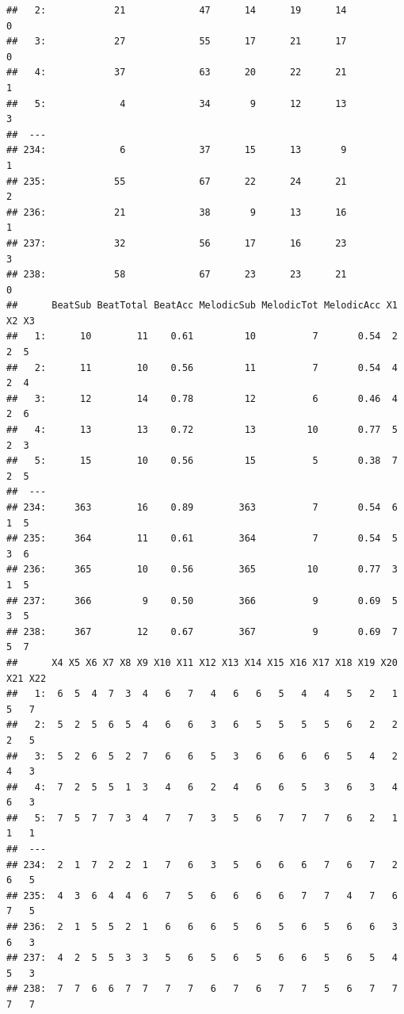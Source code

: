 \documentclass[]{book}
\theoremstyle{definition}
\theoremstyle{definition}
\theoremstyle{definition}
\theoremstyle{remark}
\begin{document}
\begin{verbatim}
##   2:            21             47      14      19      14               0
##   3:            27             55      17      21      17               0
##   4:            37             63      20      22      21               1
##   5:             4             34       9      12      13               3
##  ---                                                                     
## 234:             6             37      15      13       9               1
## 235:            55             67      22      24      21               2
## 236:            21             38       9      13      16               1
## 237:            32             56      17      16      23               3
## 238:            58             67      23      23      21               0
##      BeatSub BeatTotal BeatAcc MelodicSub MelodicTot MelodicAcc X1 X2 X3
##   1:      10        11    0.61         10          7       0.54  2  2  5
##   2:      11        10    0.56         11          7       0.54  4  2  4
##   3:      12        14    0.78         12          6       0.46  4  2  6
##   4:      13        13    0.72         13         10       0.77  5  2  3
##   5:      15        10    0.56         15          5       0.38  7  2  5
##  ---                                                                    
## 234:     363        16    0.89        363          7       0.54  6  1  5
## 235:     364        11    0.61        364          7       0.54  5  3  6
## 236:     365        10    0.56        365         10       0.77  3  1  5
## 237:     366         9    0.50        366          9       0.69  5  3  5
## 238:     367        12    0.67        367          9       0.69  7  5  7
##      X4 X5 X6 X7 X8 X9 X10 X11 X12 X13 X14 X15 X16 X17 X18 X19 X20 X21 X22
##   1:  6  5  4  7  3  4   6   7   4   6   6   5   4   4   5   2   1   5   7
##   2:  5  2  5  6  5  4   6   6   3   6   5   5   5   5   6   2   2   2   5
##   3:  5  2  6  5  2  7   6   6   5   3   6   6   6   6   5   4   2   4   3
##   4:  7  2  5  5  1  3   4   6   2   4   6   6   5   3   6   3   4   6   3
##   5:  7  5  7  7  3  4   7   7   3   5   6   7   7   7   6   2   1   1   1
##  ---                                                                      
## 234:  2  1  7  2  2  1   7   6   3   5   6   6   6   7   6   7   2   6   5
## 235:  4  3  6  4  4  6   7   5   6   6   6   6   7   7   4   7   6   7   5
## 236:  2  1  5  5  2  1   6   6   6   5   6   5   6   5   6   6   3   6   3
## 237:  4  2  5  5  3  3   5   6   5   6   5   6   6   5   6   5   4   5   3
## 238:  7  7  6  6  7  7   7   7   6   7   6   7   7   5   6   7   7   7   7

\end{verbatim}
\end{document}
